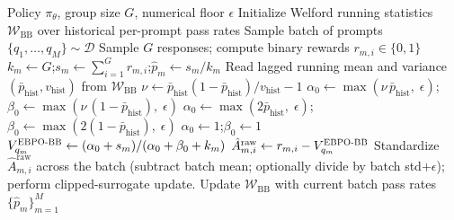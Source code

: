 \documentclass{article}
\theoremstyle{plain}
\theoremstyle{definition}
\theoremstyle{remark}
\newcommand{\oursBB}{\textsc{EBPO-BB}\xspace}
\begin{document}
\begin{algorithm}[tb]
     \caption{EBPO Advantage Estimation (Beta-Binomial Variant)}
     \label{alg:EBPO_BB}
  \begin{algorithmic}[1]
      Policy $\pi_\theta$, group size $G$, numerical floor $\epsilon$
     \STATE Initialize Welford running statistics $\mathcal{W}_{\mathrm{BB}}$ over historical per-prompt pass rates
         \STATE Sample batch of prompts $\{q_1,\dots,q_M\}\sim\mathcal{D}$
             \STATE Sample $G$ responses; compute binary rewards $r_{m,i}\in\{0,1\}$
             \STATE $k_m \gets G$;\quad $s_m \gets \sum_{i=1}^{G} r_{m,i}$;\quad $\hat p_m \gets s_m / k_m$
         \ENDFOR
         \STATE {}
             \STATE Read lagged running mean and variance $(\bar p_{\mathrm{hist}}, v_{\mathrm{hist}})$ from $\mathcal{W}_{\mathrm{BB}}$
                 \STATE $\nu \gets \bar p_{\mathrm{hist}}(1-\bar p_{\mathrm{hist}})/v_{\mathrm{hist}} - 1$
                 \STATE $\alpha_0 \gets \max(\nu\, \bar p_{\mathrm{hist}},\;\epsilon)$;\quad $\beta_0 \gets \max(\nu\,(1-\bar p_{\mathrm{hist}}),\;\epsilon)$
             \ELSE
                 \STATE {}
                 \STATE $\alpha_0 \gets \max(2\bar p_{\mathrm{hist}},\;\epsilon)$;\quad $\beta_0 \gets \max(2(1-\bar p_{\mathrm{hist}}),\;\epsilon)$
             \ENDIF
         \ELSE
             \STATE {}
             \STATE $\alpha_0 \gets 1$;\quad $\beta_0 \gets 1$
         \ENDIF
             \STATE $V_{q_m}^{\oursBB} \gets (\alpha_0 + s_m) / (\alpha_0 + \beta_0 + k_m)$ 
                 \STATE $\hat{A}_{m,i}^{\text{raw}} \gets r_{m,i} - V_{q_m}^{\oursBB}$
             \ENDFOR
         \ENDFOR
         \STATE Standardize $\hat{A}_{m,i}^{\text{raw}}$ across the batch (subtract batch mean; optionally divide by batch std$+\epsilon$); perform clipped-surrogate update.
         \STATE Update $\mathcal{W}_{\mathrm{BB}}$ with current batch pass rates $\{\hat p_m\}_{m=1}^{M}$
     \ENDFOR
  \end{algorithmic}
  \end{algorithm}
\end{document}

